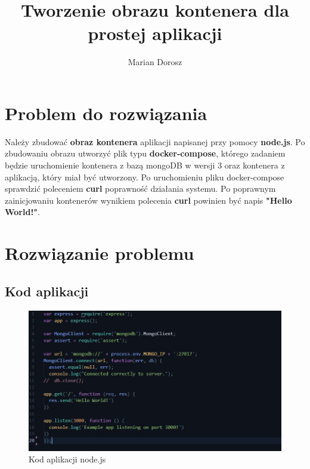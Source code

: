 \documentclass[12pt, a4paper]{article}
\title{Tworzenie obrazu kontenera dla prostej aplikacji}
\author{Marian Dorosz}
\date{}
\begin{document}
\maketitle
\thispagestyle{empty}
\newpage
\tableofcontents
\newpage
\listoffigures
\newpage
\section{Problem do rozwiązania}
    Należy zbudować \textbf{obraz kontenera} aplikacji napisanej przy pomocy \textbf{node.js}. Po zbudowaniu obrazu utworzyć plik typu \textbf{docker-compose}, którego zadaniem będzie uruchomienie kontenera z bazą mongoDB w wersji 3 oraz kontenera z aplikacją, który miał być utworzony. Po uruchomieniu pliku docker-compose sprawdzić poleceniem \textbf{curl} poprawność działania systemu. Po poprawnym zainicjowaniu kontenerów wynikiem polecenia \textbf{curl} powinien być napis \textbf{"Hello World!"}.
\section{Rozwiązanie problemu}
    \subsection{Kod aplikacji}
        \begin{figure}[!h]
            \centering
            \includegraphics[width=\textwidth]{aplikacja.JPG}
            \caption{Kod aplikacji node.js}
            \label{fig:aplikacja}
        \end{figure}
    \newpage
\end{document}
